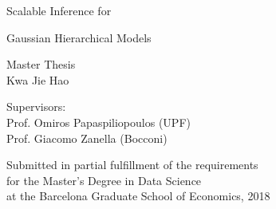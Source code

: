 \documentclass[]{article}
\title{}
\author{}
\date{}
\begin{document}
\newcommand{\smallfont}[1]{{%
  \fontsize{10pt}{12pt}\normalfont #1%
}}
\newcommand{\midsmallfont}[1]{{%
  \fontsize{15pt}{17pt}\normalfont #1%
}}
\newcommand{\normfont}[1]{{%
  \fontsize{20pt}{24pt}\normalfont #1%
}}
\newcommand{\midfont}[1]{{%
  \fontsize{24pt}{28pt}\normalfont #1%
}}
\newcommand{\bigfont}[1]{{%
  \fontsize{30pt}{36pt}\normalfont #1%
}}

\leavevmode
\newline
\newline
\newline
\newline
\newline
\newline
\newline
\newline
\newline
\newline
\newline
\newline

\begin{center}
\bigfont{Scalable Inference for}

\midfont{Gaussian Hierarchical Models} 
\end{center}

\vspace{2.0cm}

\begin{center}
\large Master Thesis \\ Kwa Jie Hao
\end{center}

\vspace{0.5cm}

\begin{spacing}{1.0}
\begin{center}
\large Supervisors: \\ Prof. Omiros Papaspiliopoulos (UPF) \\ Prof. Giacomo Zanella (Bocconi)
\end{center}
\end{spacing}

\vspace{2.0cm}

\begin{center}
\normalsize Submitted in partial fulfillment of the requirements \\ for the Master's Degree in Data Science \\ at the Barcelona Graduate School of Economics, 2018
\end{center}
\end{document}
